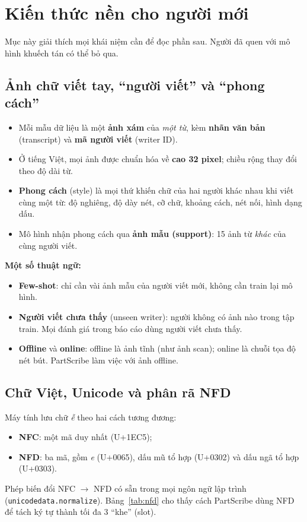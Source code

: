 \documentclass[11pt,a4paper]{article}
\begin{document}
\section{Kiến thức nền cho người mới}
\label{sec:background}
Mục này giải thích mọi khái niệm cần để đọc phần sau. Người đã quen với mô hình khuếch tán có thể bỏ qua.

\subsection{Ảnh chữ viết tay, ``người viết'' và ``phong cách''}
\begin{itemize}
\item Mỗi mẫu dữ liệu là một \textbf{ảnh xám} của \emph{một từ}, kèm \textbf{nhãn văn bản} (transcript) và \textbf{mã người viết} (writer ID).
\item Ở tiếng Việt, mọi ảnh được chuẩn hóa về \textbf{cao 32 pixel}; chiều rộng thay đổi theo độ dài từ.
\item \textbf{Phong cách} (style) là mọi thứ khiến chữ của hai người khác nhau khi viết cùng một từ: độ nghiêng, độ dày nét, cỡ chữ, khoảng cách, nét nối, hình dạng dấu.
\item Mô hình nhận phong cách qua \textbf{ảnh mẫu (support)}: 15 ảnh từ \emph{khác} của cùng người viết.
\end{itemize}

\textbf{Một số thuật ngữ:}
\begin{itemize}
\item \textbf{Few-shot}: chỉ cần vài ảnh mẫu của người viết mới, không cần train lại mô hình.
\item \textbf{Người viết chưa thấy} (unseen writer): người không có ảnh nào trong tập train. Mọi đánh giá trong báo cáo dùng người viết chưa thấy.
\item \textbf{Offline} và \textbf{online}: offline là ảnh tĩnh (như ảnh scan); online là chuỗi tọa độ nét bút. PartScribe làm việc với ảnh offline.
\end{itemize}

\subsection{Chữ Việt, Unicode và phân rã NFD}
\label{sec:viet}
Máy tính lưu chữ \emph{ễ} theo hai cách tương đương:
\begin{itemize}
\item \textbf{NFC}: một mã duy nhất (U+1EC5);
\item \textbf{NFD}: ba mã, gồm \emph{e} (U+0065), dấu mũ tổ hợp (U+0302) và dấu ngã tổ hợp (U+0303).
\end{itemize}
Phép biến đổi NFC $\to$ NFD có sẵn trong mọi ngôn ngữ lập trình (\texttt{unicodedata.normalize}). Bảng~\ref{tab:nfd} cho thấy cách PartScribe dùng NFD để tách ký tự thành tối đa 3 ``khe'' (slot).
\end{document}
